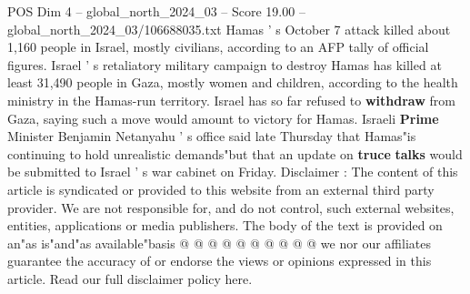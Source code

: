 \begin{textsample}{POS Dim 4 – global\_north\_2024\_03 – Score 19.00 – global\_north\_2024\_03/106688035.txt}
Hamas ' s October 7 attack killed about 1,160 people in Israel, mostly civilians, according to an AFP tally of official figures.
Israel ' s retaliatory military campaign to destroy Hamas has killed at least 31,490 people in Gaza, mostly women and children, according to the health ministry in the Hamas-run territory.
Israel has so far refused to \textbf{withdraw} from Gaza, saying such a move would amount to victory for Hamas.
Israeli \textbf{Prime} Minister Benjamin Netanyahu ' s office said late Thursday that Hamas"is continuing to hold unrealistic demands"but that an update on \textbf{truce} \textbf{talks} would be submitted to Israel ' s war cabinet on Friday.
Disclaimer : The content of this article is syndicated or provided to this website from an external third party provider.
We are not responsible for, and do not control, such external websites, entities, applications or media publishers.
The body of the text is provided on an"as is"and"as available"basis @ @ @ @ @ @ @ @ @ @ we nor our affiliates guarantee the accuracy of or endorse the views or opinions expressed in this article.
Read our full disclaimer policy here.

\end{textsample}
